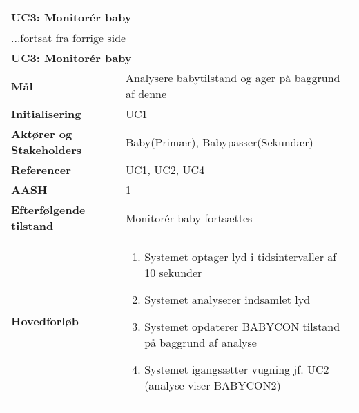 \begin{center} \centering \label{kravspec:uc3}
	\begin{longtable}{|p{5cm}|p{9cm}|}  %
	\hline
		\multicolumn{2}{|l|}{\textbf{UC3: Monitorér baby}} \\\hline %
		\endfirsthead
		
		\multicolumn{2}{l}{...fortsat fra forrige side} \\ \hline %
		\multicolumn{2}{|l|}{\textbf{UC3: Monitorér baby}} \\\hline %
		\endhead	
		
		\textbf{Mål}							&Analysere babytilstand og ager på baggrund af denne	\\\hline
		\textbf{Initialisering}				&UC1		\\\hline
		\textbf{Aktører og Stakeholders}		&Baby(Primær), Babypasser(Sekundær)		\\\hline 
		\textbf{Referencer}					&UC1, UC2, UC4		\\\hline
		\textbf{AASH}						&1		\\\hline
		\textbf{Efterfølgende tilstand}		&Monitorér baby fortsættes		\\\hline
		\textbf{Hovedforløb}					
			&\begin{enumerate}
					
				\item \label{kravspec:uc3_optagelse}Systemet optager lyd i tidsintervaller af 10 sekunder 				
				\newline [Und: \ref{kravspec:uc3_optagelse}.a Fejl ved lydoptagelse]
				
				\item Systemet analyserer indsamlet lyd 
				
				\item Systemet opdaterer BABYCON tilstand på baggrund af analyse
				
				\item \label{kravspec:uc3_lydanalyse}Systemet igangsætter vugning jf. UC2 (analyse viser BABYCON2)			
				\newline [Und: \ref{kravspec:uc3_lydanalyse}.a Vugning allerede igang (forrige analyse viste BABYCON2)]
				\newline [Und: \ref{kravspec:uc3_lydanalyse}.b Analyse viser BABYCON3 (forrige analyse viste BABYCON2)]
				\newline [Und: \ref{kravspec:uc3_lydanalyse}.c Analyse viser BABYCON3 (forrige analyse viste BABYCON3)]
				\newline [Und: \ref{kravspec:uc3_lydanalyse}.d Analyse viser BABYCON1]
				

\end{enumerate}
\end{longtable}
\end{center}

